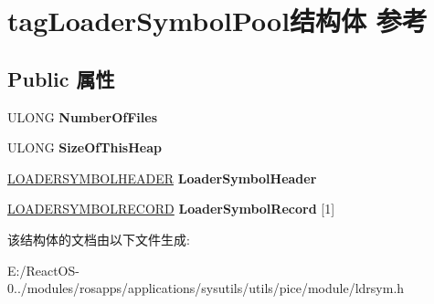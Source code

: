 \hypertarget{structtag_loader_symbol_pool}{}\section{tag\+Loader\+Symbol\+Pool结构体 参考}
\label{structtag_loader_symbol_pool}
\subsection*{Public 属性}
\begin{DoxyCompactItemize}
\item 
\mbox{\label{structtag_loader_symbol_pool_af27f9865d1ded1a43d523433a436e39d}} 
U\+L\+O\+NG {\bfseries Number\+Of\+Files}
\item 
\mbox{\label{structtag_loader_symbol_pool_aa68fb000e24b68c830267add35dd1bbe}} 
U\+L\+O\+NG {\bfseries Size\+Of\+This\+Heap}
\item 
\mbox{\label{structtag_loader_symbol_pool_ac64e4be7d9e3198cb652c82f7b411186}} 
\hyperlink{structtag_loader_symbol_header}{L\+O\+A\+D\+E\+R\+S\+Y\+M\+B\+O\+L\+H\+E\+A\+D\+ER} {\bfseries Loader\+Symbol\+Header}
\item 
\mbox{\label{structtag_loader_symbol_pool_a2f03daedf758aa961ccad6d05714da0d}} 
\hyperlink{structtag_loader_symbol_record}{L\+O\+A\+D\+E\+R\+S\+Y\+M\+B\+O\+L\+R\+E\+C\+O\+RD} {\bfseries Loader\+Symbol\+Record} \mbox{[}1\mbox{]}
\end{DoxyCompactItemize}


该结构体的文档由以下文件生成\+:\begin{DoxyCompactItemize}
\item 
E\+:/\+React\+O\+S-\/0../modules/rosapps/applications/sysutils/utils/pice/module/ldrsym.\+h\end{DoxyCompactItemize}
